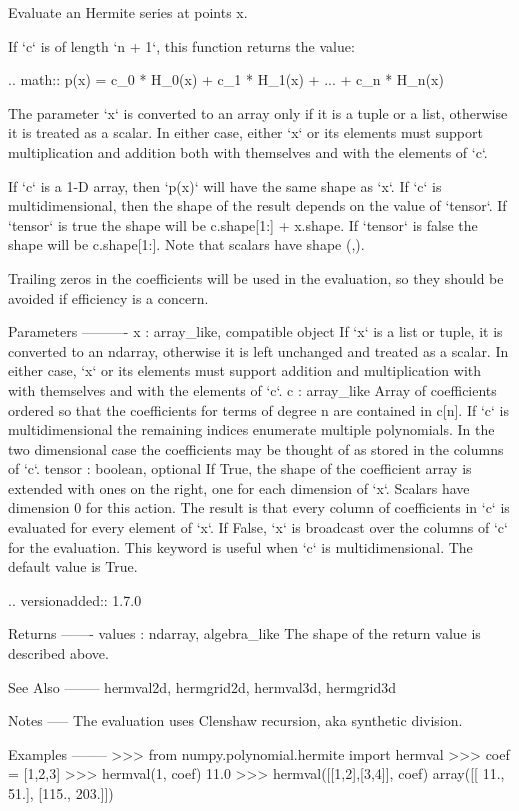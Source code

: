 \begin{DoxyVerb}Evaluate an Hermite series at points x.

If `c` is of length `n + 1`, this function returns the value:

.. math:: p(x) = c_0 * H_0(x) + c_1 * H_1(x) + ... + c_n * H_n(x)

The parameter `x` is converted to an array only if it is a tuple or a
list, otherwise it is treated as a scalar. In either case, either `x`
or its elements must support multiplication and addition both with
themselves and with the elements of `c`.

If `c` is a 1-D array, then `p(x)` will have the same shape as `x`.  If
`c` is multidimensional, then the shape of the result depends on the
value of `tensor`. If `tensor` is true the shape will be c.shape[1:] +
x.shape. If `tensor` is false the shape will be c.shape[1:]. Note that
scalars have shape (,).

Trailing zeros in the coefficients will be used in the evaluation, so
they should be avoided if efficiency is a concern.

Parameters
----------
x : array_like, compatible object
    If `x` is a list or tuple, it is converted to an ndarray, otherwise
    it is left unchanged and treated as a scalar. In either case, `x`
    or its elements must support addition and multiplication with
    with themselves and with the elements of `c`.
c : array_like
    Array of coefficients ordered so that the coefficients for terms of
    degree n are contained in c[n]. If `c` is multidimensional the
    remaining indices enumerate multiple polynomials. In the two
    dimensional case the coefficients may be thought of as stored in
    the columns of `c`.
tensor : boolean, optional
    If True, the shape of the coefficient array is extended with ones
    on the right, one for each dimension of `x`. Scalars have dimension 0
    for this action. The result is that every column of coefficients in
    `c` is evaluated for every element of `x`. If False, `x` is broadcast
    over the columns of `c` for the evaluation.  This keyword is useful
    when `c` is multidimensional. The default value is True.

    .. versionadded:: 1.7.0

Returns
-------
values : ndarray, algebra_like
    The shape of the return value is described above.

See Also
--------
hermval2d, hermgrid2d, hermval3d, hermgrid3d

Notes
-----
The evaluation uses Clenshaw recursion, aka synthetic division.

Examples
--------
>>> from numpy.polynomial.hermite import hermval
>>> coef = [1,2,3]
>>> hermval(1, coef)
11.0
>>> hermval([[1,2],[3,4]], coef)
array([[ 11.,   51.],
       [115.,  203.]])\end{DoxyVerb}
 \mbox{\label{namespacenumpy_1_1polynomial_1_1hermite_a41ebca0ba98fa3e6aea923149a58bbf9}} 
